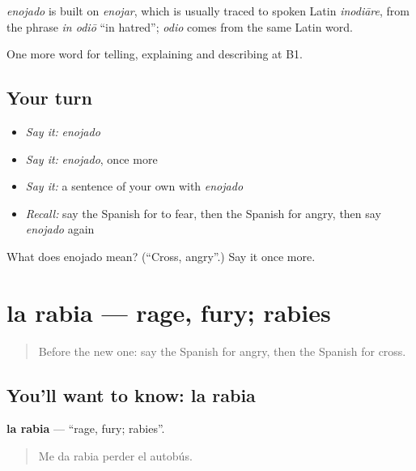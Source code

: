 \begin{cousinweb}
\emph{enojado} is built on \emph{enojar}, which is usually traced to spoken Latin \emph{inodiāre}, from the phrase \emph{in odiō} \textquotedblleft{}in hatred\textquotedblright{}; \emph{odio} comes from the same Latin word.
\end{cousinweb}

\begin{grammarlens}[title={What you've built}]
One more word for telling, explaining and describing at B1.
\end{grammarlens}

\subsection*{Your turn}
\begin{itemize}
\raggedright
  \item \emph{Say it:} \emph{enojado}
  \item \emph{Say it:} \emph{enojado}, once more
  \item \emph{Say it:} a sentence of your own with \emph{enojado}
  \item \emph{Recall:} say the Spanish for to fear, then the Spanish for angry, then say \emph{enojado} again
\end{itemize}

\begin{tcolorbox}[breakable,colback=teal!4,colframe=teal!35!black,title={Before you move on}]
What does enojado mean? (\textquotedblleft{}Cross, angry\textquotedblright{}.) Say it once more.
\end{tcolorbox}
\section[la rabia]{la rabia — rage, fury; rabies}

\label{lesson:ES-C707-rabia}



\begin{quote}
Before the new one: say the Spanish for angry, then the Spanish for cross.
\end{quote}

\subsection*{You'll want to know: la rabia}
\textbf{la rabia} — \textquotedblleft{}rage, fury; rabies\textquotedblright{}.

\begin{quote}
Me da rabia perder el autobús.
\end{quote}

